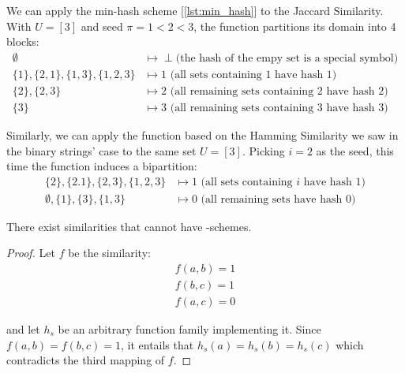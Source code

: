 \begin{example}
    We can apply the min-hash scheme [\ref{lst:min_hash}] to the Jaccard Similarity. With $U = [3]$ and seed $\pi = 1 < 2 < 3$, the function partitions its domain into 4 blocks:
    \begin{align*}
        \emptyset                           &\mapsto \perp \text{(the hash of the empy set is a special symbol)} \\
        \{1\}, \{2,1\}, \{1,3\}, \{1,2,3\}  &\mapsto 1 \text{ (all sets containing 1 have hash 1)} \\
        \{2\}, \{2,3\}                      &\mapsto 2 \text{ (all remaining sets containing 2 have hash 2)} \\
        \{3\}                               &\mapsto 3 \text{ (all remaining sets containing 3 have hash 3)}
    \end{align*}
\end{example} 

\begin{example}
    Similarly, we can apply the function based on the Hamming Similarity we saw in the binary strings' case to the same set $U = [3]$. Picking $i = 2$ as the seed, this time the function induces a bipartition:
    \begin{align*}
        \{2\}, \{2.1\}, \{2,3\}, \{1,2,3\}  &\mapsto 1 \text{ (all sets containing $i$ have hash 1)} \\
        \emptyset, \{1\}, \{3\}, \{1,3\}    &\mapsto 0 \text{ (all remaining sets have hash 0)}
    \end{align*}
\end{example}




\begin{proposition} \label{ex:transitivity}
    There exist similarities that cannot have \lsh-schemes.
\end{proposition}

\begin{proof}
    Let $f$ be the similarity:
    \begin{align*}
        f(a, b) = 1 \\
        f(b, c) = 1 \\
        f(a, c) = 0
    \end{align*}

    and let $h_s$ be an arbitrary function family implementing it. Since $f(a, b) = f(b, c) = 1$, it entails that $h_s(a) = h_s(b) = h_s(c)$ which contradicts the third mapping of $f$.
\end{proof}


